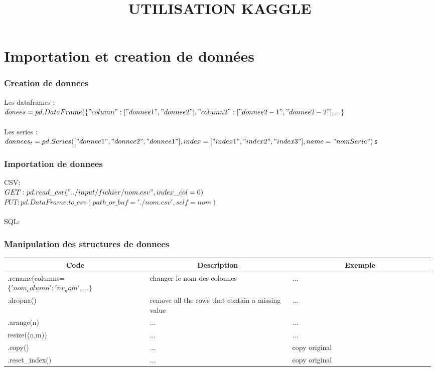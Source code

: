 \documentclass{article}
\title{UTILISATION KAGGLE}
\date{}
\begin{document}
\maketitle
    \part*{Importation et creation de données}
    
	\section*{Creation de donnees}
	Les dataframes : \\
	\texttt{$donees = pd.DataFrame(\{ 
	"column" : ["donnee1","donnee2"],  
	"column2" : ["donnee2-1","donnee2-2"],... \}
	$}  
	\\ \\Les series : \\
    \texttt{$donnees_t = pd.Series(
    ["donnee1","donnee2","donnee1"],
    index=["index1","index2","index3"],
    name="nomSerie")$s}
	
    
    \section*{Importation de donnees}
    CSV:
    \\
     \texttt{$GET : pd.read\_csv("../input/fichier/nom.csv",index\_col=0)$}\\
    \texttt{$PUT : pd.DataFrame.to\_csv(path\_or\_buf='./nom.csv',self=nom)$}
    \\ \\SQL:\\
    
    \section*{Manipulation des structures de donnees}
    
    \begin{tabular}{|p{0.33\linewidth}|p{0.33\linewidth}|p{0.33\linewidth}|}
	\hline
	\multicolumn{1}{|c|}{\textbf{Code}} &
	\multicolumn{1}{c|}{\textbf{Description}} &
	\multicolumn{1}{c|}{\textbf{Exemple}} \\ \hline
	.rename(columns= \texttt{$\{ 'nom_column':'nv_nom',...\}$} & changer le nom des colonnes & ... \\ \hline
	.dropna() & remove all the rows that contain a missing value & ...  \\  \hline
	.arange(n) & ... & ...  \\ \hline
	resize((n,m)) & ... & ...  \\ \hline
	.copy() & ... & copy original   \\  \hline
	.reset\_index() & ... & copy original   \\  
	\hline
	\end{tabular}
\end{document}
